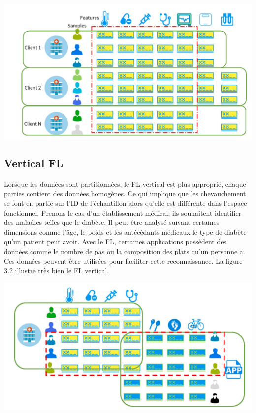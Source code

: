 \documentclass[12pt,a4paper]{report}
\begin{document}
\begin{center}
	\includegraphics[scale=0.2]{fl_horizontal}
	\label{fig1}
\end{center}


\subsection{Vertical FL}

Lorsque les données sont partitionnées, le FL vertical est plus approprié, chaque parties contient des données homogènes. Ce qui implique que les chevauchement se font en partie sur l'ID de l'échantillon alors qu'elle est différente dans l'espace fonctionnel. Prenons le cas d'un établissement médical, ils souhaitent identifier des maladies telles que le diabète. Il peut être analysé suivant certaines dimensions comme l'âge, le poids et les antécédants médicaux le type de diabète qu'un patient peut avoir. Avec le FL, certaines applications possèdent des données comme le nombre de pas ou la composition des plats qu'un personne a. Ces données peuvent être utilisées pour faciliter cette reconnaissance. La figure 3.2 illustre très bien le FL vertical.

\begin{center}
	\includegraphics[scale=0.2]{fl_vertical}
	\label{fig1}
\end{center}
\pagebreak
\end{document}
